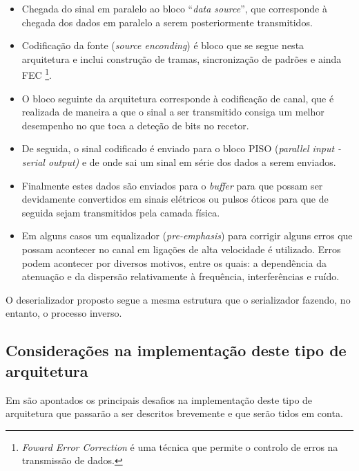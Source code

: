 \begin{itemize}
	\item Chegada do sinal em paralelo ao bloco “\textit{data source}”, que corresponde à chegada dos dados em paralelo a serem posteriormente transmitidos.
	\item Codificação da fonte (\textit{source enconding}) é bloco que se segue nesta arquitetura e inclui construção de tramas, sincronização de padrões e ainda FEC \footnote{\textit{Foward Error Correction} é uma técnica que permite o controlo de erros na transmissão de dados.}.
	\item O bloco seguinte da arquitetura corresponde à codificação de canal, que é realizada de maneira a que o sinal a ser transmitido consiga um melhor desempenho no que toca a deteção de bits no recetor.
	\item De seguida, o sinal codificado é enviado para o bloco PISO (\textit{parallel input - serial output)} e de onde sai um sinal em série dos dados a serem enviados.
	\item Finalmente estes dados são enviados para o \textit{buffer} para que possam ser devidamente convertidos em sinais elétricos ou pulsos óticos para que de seguida sejam transmitidos pela camada física. 
	\item Em alguns casos um equalizador (\textit{pre-emphasis}) para corrigir alguns erros que possam acontecer no canal em ligações de alta velocidade é utilizado. Erros podem acontecer por diversos motivos, entre os quais: a dependência da atenuação e da dispersão relativamente à frequência, interferências e ruído.
\end{itemize}

O deserializador proposto segue a mesma estrutura que o serializador fazendo, no entanto, o processo inverso.

\subsection{Considerações na implementação deste tipo de arquitetura}
Em \cite{R012} são apontados os principais desafios na implementação deste tipo de arquitetura que passarão a ser descritos brevemente e que serão tidos em conta.

